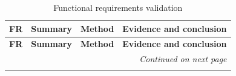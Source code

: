 \begin{longtable}{|p{}|p{}|p{}|p{}|}
	\caption{Functional requirements validation}
	\label{tab:requirements-traceability}                                                                                                                                                                                                                                                                            \\
	\hline
	\textbf{FR} & \textbf{Summary}                                                & \textbf{Method}         & \textbf{Evidence and conclusion}                                                                                                                                                                       \\
	\hline
	\endfirsthead
	\hline
	\textbf{FR} & \textbf{Summary}                                                & \textbf{Method}         & \textbf{Evidence and conclusion}                                                                                                                                                                       \\
	\hline
	\endhead
	\hline
	\multicolumn{4}{|r|}{\emph{Continued on next page}}                                                                                                                                                                                                                                                              \\
	\hline
	\endfoot
	\hline
	\endlastfoot


\end{longtable}
